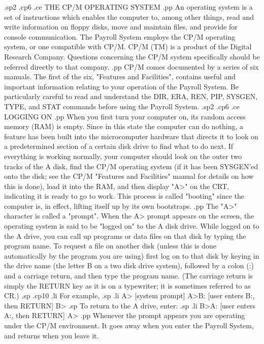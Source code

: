 .sp2
.cp6
.ce
THE CP/M OPERATING SYSTEM
.pp
An operating system is a set of instructions which enables the computer to,
among other things, read and write information on floppy disks, move and
maintain files, and provide for console communication.	The Payroll
System
employs the CP/M operating system, or one compatible with CP/M.  CP/M (TM) is a
product of the Digital Research Company. Questions concerning the
CP/M system specifically should be referred directly to that company.
.pp
CP/M comes documented by a series of six manuals.  The first of the six,
"Features and Facilities", contains useful and important information
relating to your operation of the Payroll System.  Be particularly
careful to read and understand the DIR, ERA, REN, PIP, SYSGEN, TYPE,
and STAT commands before using the Payroll System.
.sp2
.cp6
.ce
LOGGING ON
.pp
When you first turn your computer on, its random access memory (RAM) is
empty.	Since in this state the computer can do nothing,
a feature has been built into the microcomputer hardware that
directs it to look on a predetermined section of a certain disk drive to find
what to do next.  If everything is working normally, your computer should
look on the outer two tracks of the A disk, find the CP/M operating system
(if it has been SYSGEN'ed onto the disk; see the CP/M "Features and Facilities"
manual for details on how this is done), load it into the RAM, and then
display "A>" on the CRT, indicating it is ready to go to work.  This
process is called "booting" since the computer is, in effect, lifting itself
up by its own bootstraps.
.pp
The "A>" character is called a "prompt".  When the A> prompt appears on the
screen, the operating system is said to be "logged on" to the A disk drive.
While logged on to the A drive, you can call up programs or data files on that
disk by typing the program name.
To request a file on another disk (unless this is done automatically
by the program you are using) first log on to that disk by keying in
the drive name (the letter B on a two disk drive system), followed by a
colon (:) and a carriage return, and then type the program name.
(The carriage return is simply the RETURN
key as it is on a typewriter; it is sometimes referred to as CR.)
.sp
.cp10
.li
	For example,
.sp
.li
	   A>		   [system prompt]
	   A>B: 	   [user enters B:, then RETURN]
	   B>
.sp
To return to the A drive, enter:
.sp
.li
	   B>A: 	   [user enters A:, then RETURN]
	   A>
.pp
Whenever the prompt appears you are operating under the CP/M
environment.  It goes away when you enter the Payroll System, and
returns when you leave it.
